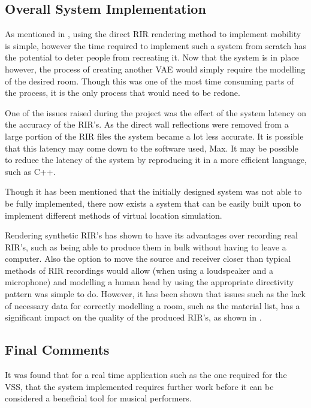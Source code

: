 \documentclass[../../main.tex]{subfiles}
\begin{document}




		\subsection{Overall System Implementation}
			 As mentioned in , using the direct \ac{RIR} rendering method to implement mobility is simple, however the time required to implement such a system from scratch has the potential to deter people from recreating it. Now that the system is in place however, the process of creating another \ac{VAE} would simply require the modelling of the desired room. Though this was one of the most time consuming parts of the process, it is the only process that would need to be redone.

			 One of the issues raised during the project was the effect of the system latency on the accuracy of the \ac{RIR}'s. As the direct wall reflections were removed from a large portion of the \ac{RIR} files the system became a lot less accurate. It is possible that this latency may come down to the software used, Max. It may be possible to reduce the latency of the system by reproducing it in a more efficient language, such as C++.

			Though it has been mentioned that the initially designed system was not able to be fully implemented, there now exists a system that can be easily built upon to implement different methods of virtual location simulation.

			Rendering synthetic \ac{RIR}'s has shown to have its advantages over recording real \ac{RIR}'s, such as being able to produce them in bulk without having to leave a computer. Also the option to move the source and receiver closer than typical methods of \ac{RIR} recordings would allow (when using a loudspeaker and a microphone) and modelling a human head by using the appropriate directivity pattern was simple to do. However, it has been shown that issues such as the lack of necessary data for correctly modelling a room, such as the material list, has a significant impact on the quality of the produced \ac{RIR}'s, as shown in .

		\subsection{Final Comments}
			It was found that for a real time application such as the one required for the VSS, that the system implemented requires further work before it can be considered a beneficial tool for musical performers.
\end{document}
